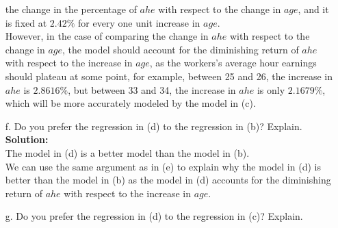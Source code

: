 \documentclass{uofa-eng-assignment}
\begin{document}
\begin{enumerate}
        the change in the percentage of $ahe$ with respect to the change in $age$, and
        it is fixed at $\boldsymbol{2.42\%}$ for every one unit increase in $age$. \\
        However, in the case of comparing the change in $ahe$ with respect to the
        change in $age$, the model should account for the diminishing return of $ahe$
        with respect to the increase in $age$, as the workers's average hour earnings
        should plateau at some point, for example, between 25 and 26, the increase in
        $ahe$ is $\boldsymbol{2.8616\%}$, but between 33 and 34, the increase in $ahe$
        is only $\boldsymbol{2.1679\%}$, which will be more accurately modeled by the
        model in (c). \\
    \item[f.] Do you prefer the regression in (d) to the regression in (b)? Explain. \\
        \textbf{Solution:} \\ The model in (d) is a better model than the model in (b).
        \\ We can use the same argument as in (e) to explain why the model in (d) is
        better than the model in (b) as the model in (d) accounts for the diminishing
        return of $ahe$ with respect to the increase in $age$.
    \item[g.] Do you prefer the regression in (d) to the regression in (c)? Explain. \\

\end{enumerate}
\end{document}
